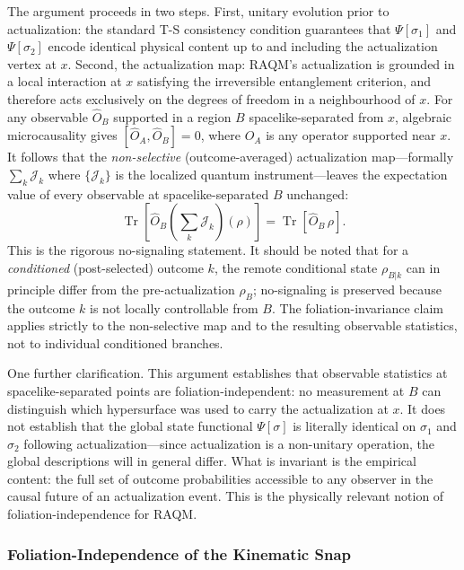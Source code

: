 \documentclass[11pt,a4paper]{article}
\theoremstyle{plain}
\theoremstyle{definition}
\theoremstyle{remark}
\newcommand{\inst}{\mathcal{J}}          %
\begin{document}
The argument proceeds in two steps. First, unitary evolution prior to actualization:
the standard T-S consistency condition guarantees that $\Psi[\sigma_1]$ and
$\Psi[\sigma_2]$ encode identical physical content up to and including the
actualization vertex at $x$. Second, the actualization map: RAQM's actualization
is grounded in a local interaction at $x$ satisfying the irreversible entanglement
criterion, and therefore acts exclusively on the degrees of freedom in a
neighbourhood of $x$. For any observable $\hat{O}_B$ supported in a region $B$
spacelike-separated from $x$, algebraic microcausality gives $[\hat{O}_A,
\hat{O}_B] = 0$, where $\hat{O}_A$ is any operator supported near $x$. It follows
that the \emph{non-selective} (outcome-averaged) actualization map---formally
$\sum_k \inst_k$ where $\{\inst_k\}$ is the localized quantum
instrument---leaves the expectation value of every observable at
spacelike-separated $B$ unchanged:
\begin{equation}
  \operatorname{Tr}\!\left[\hat{O}_B \left(\sum_k \inst_k\right)\!(\rho)\right]
  = \operatorname{Tr}[\hat{O}_B\,\rho].
  \label{eq:nosig}
\end{equation}
This is the rigorous no-signaling statement. It should be noted that for a
\emph{conditioned} (post-selected) outcome $k$, the remote conditional state
$\rho_{B|k}$ can in principle differ from the pre-actualization $\rho_B$;
no-signaling is preserved because the outcome $k$ is not locally controllable from
$B$. The foliation-invariance claim applies strictly to the non-selective map and
to the resulting observable statistics, not to individual conditioned branches.

One further clarification. This argument establishes that observable statistics at
spacelike-separated points are foliation-independent: no measurement at $B$ can
distinguish which hypersurface was used to carry the actualization at $x$. It does
not establish that the global state functional $\Psi[\sigma]$ is literally
identical on $\sigma_1$ and $\sigma_2$ following actualization---since actualization
is a non-unitary operation, the global descriptions will in general differ. What
is invariant is the empirical content: the full set of outcome probabilities
accessible to any observer in the causal future of an actualization event. This is
the physically relevant notion of foliation-independence for RAQM.

\subsubsection{Foliation-Independence of the Kinematic Snap}
\label{sec:foliation-snap}
\end{document}
